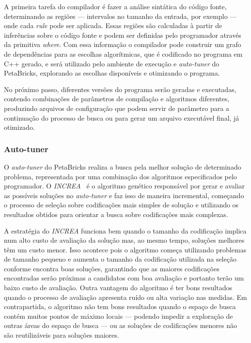 \documentclass[a4paper, 12pt]{article}
\begin{document}
A primeira tarefa do compilador é fazer a análise sintática do código fonte,
determinando as regiões --- intervalos no tamanho da entrada, por exemplo ---
onde cada \emph{rule} pode ser aplicada. Essas regiões são calculadas à partir
de inferências sobre o código fonte e podem ser definidas pelo programador
através da primitiva \emph{where}. Com essa informação o compilador pode
construir um grafo de dependências para as escolhas algorítmicas,
que é codificado no programa em C++ gerado, e será utilizado pelo ambiente de
execução e \emph{auto-tuner} do PetaBricks, explorando as escolhas disponíveis
e otimizando o programa.

No próximo passo, diferentes versões do programa serão geradas e executadas,
contendo combinações de parâmetros de compilação e algoritmos diferentes,
produzindo arquivos de configuração que podem servir de parâmetro para a
continuação do processo de busca ou para gerar um arquivo executável final,
já otimizado.

\subsubsection{Auto-tuner}\label{sec:auto-tuner}

O \emph{auto-tuner} do PetaBricks realiza a busca pela melhor solução de
determinado problema, representada por uma combinação dos algoritmos
especificados pelo programador. O \emph{INCREA}~\citet{ansel2011efficient} é o
algoritmo genético responsável por gerar e avaliar as possíveis soluções
no \emph{auto-tuner} e faz isso de maneira incremental, começando
o processo de seleção sobre codificações mais simples de solução e utilizando
os resultados obtidos para orientar a busca sobre codificações mais complexas.

A estratégia do \emph{INCREA} funciona bem quando o tamanho da codificação
implica num alto custo de avaliação da solução mas, ao mesmo tempo, soluções
melhores têm um custo menor. Isso acontece pois o algoritmo começa utilizando
problemas de tamanho pequeno e aumenta o tamanho da codificação utilizada na
seleção conforme encontra boas soluções, garantindo que as maiores codificações
encontradas serão próximas a candidatos com boa avaliação e portanto terão um
baixo custo de avaliação. Outra vantagem do algoritmo é ter bons resultados
quando o processo de avaliação apresenta ruído ou alta variação nas medidas.
Em contrapartida, o algoritmo não tem bons resultados quando o espaço de busca
contém muitos pontos de máximo locais --- podendo impedir a
exploração de outras áreas do espaço de busca --- ou as soluções de
codificações menores não são reutilizáveis para soluções maiores.
\end{document}
